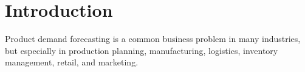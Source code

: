 
\chapter{Introduction}
\label{ch:introduction}


Product demand forecasting is a common business problem in many industries, but especially in production planning, manufacturing, logistics, inventory management, retail, and marketing.